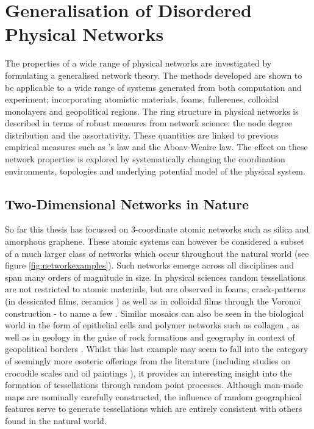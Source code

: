\chapter{Generalisation of Disordered Physical Networks}
\label{ch:generalnetworks}

\begin{chapterabstract}
The properties of a wide range of physical \td{} networks are investigated by formulating a generalised network theory.
The methods developed are shown to be applicable to a wide range of systems generated from both computation and experiment; incorporating atomistic materials, foams, fullerenes, colloidal monolayers and geopolitical regions.
The ring structure in physical networks is described in terms of robust measures from network science: the node degree distribution and the assortativity.
These quantities are linked to previous empirical measures such as \lm's law and the Aboav\--Weaire law.
The effect on these network properties is explored by systematically changing the coordination environments, topologies and underlying potential model of the physical system.
\end{chapterabstract}

\section{Two\--Dimensional Networks in Nature}

So far this thesis has focussed on 3\--coordinate atomic networks such as silica and amorphous graphene.
These atomic systems can however be considered a subset of a much larger class of \td{} networks which occur throughout the natural world (see figure \ref{fig:networkexamples}).
Such networks emerge across all disciplines and span many orders of magnitude in size.
In physical sciences random tessellations are not restricted to atomic materials, but are observed in foams, crack\--patterns  (in dessicated films, ceramics \etc) as well as in colloidal films through the Voronoi construction \-- to name a few \cite{Durand2011,Tong2017,Noever1992,Ma2019,Earnshaw1994,Allain1995,Moncho-Jorda2000}.
Similar mosaics can also be seen in the biological world in the form of epithelial cells and polymer networks such as collagen \cite{Honda1978,Carter2017,Kim2016,Broedersz2014}, as well as in geology in the guise of rock formations and geography in context of geopolitical borders \cite{Weaire1984,Goehring2014,LeCaer1993}.
Whilst this last example may seem to fall into the category of seemingly more esoteric offerings from the literature (including studies on crocodile scales and oil paintings \cite{Milinkovitch2019,Flores2017}), it provides an interesting insight into the formation of tessellations through random point processes.
Although man\--made maps are nominally carefully constructed, the influence of random geographical features serve to generate tessellations which are entirely consistent with others found in the natural world.

